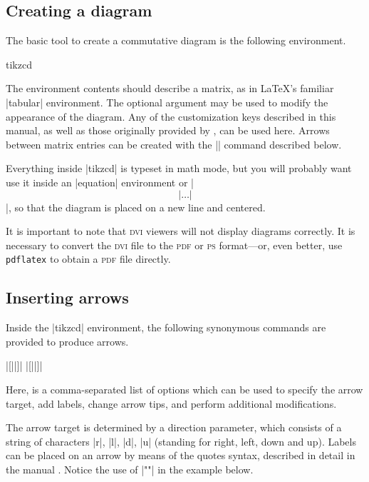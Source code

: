 \documentclass[a4paper]{ltxdoc}
\begin{document}
\subsection{Creating a diagram}
\label{sec:creating-diagrams}

The basic tool to create a commutative diagram is the following
environment.

\begin{environment}{{tikzcd}}
\end{environment}

The environment contents should describe a matrix, as in \LaTeX's
familiar |{tabular}| environment.  The optional argument
 may be used to modify the appearance of the diagram.
Any of the customization keys described in this manual, as well as
those originally provided by \tikzname{}, can be used here.  Arrows
between matrix entries can be created with the |\arrow| command
described below.

Everything inside |{tikzcd}| is typeset in math mode, but you will
probably want use it inside an |{equation}| environment or |\[| \dots
|\]|, so that the diagram is placed on a new line and centered.

It is important to note that \textsc{dvi} viewers will not display
diagrams correctly.  It is necessary to convert the \textsc{dvi} file
to the \textsc{pdf} or \textsc{ps} format---or, even better, use
\texttt{pdflatex} to obtain a \textsc{pdf} file directly.

\subsection{Inserting arrows}
\label{sec:inserting-arrows}

Inside the |{tikzcd}| environment, the following synonymous commands
are provided to produce arrows.

\begin{pgfmanualentry}
  \extractcommand\arrow|[||]|\@@
  \extractcommand\ar|[||]|\@@
  \pgfmanualbody
\end{pgfmanualentry}

Here,  is a comma-separated list of options which can be
used to specify the arrow target, add labels, change arrow tips, and
perform additional modifications.

The arrow target is determined by a direction parameter, which
consists of a string of characters |r|, |l|, |d|, |u| (standing for
right, left, down and up).  Labels can be placed on an arrow by means
of the quotes syntax, described in detail in the \pgfname{} manual
\cite[\S\ref*{pgfman-section-label-quotes}]{pgfman}.  Notice the use of
|"\phi"| in the example below.
\end{document}
